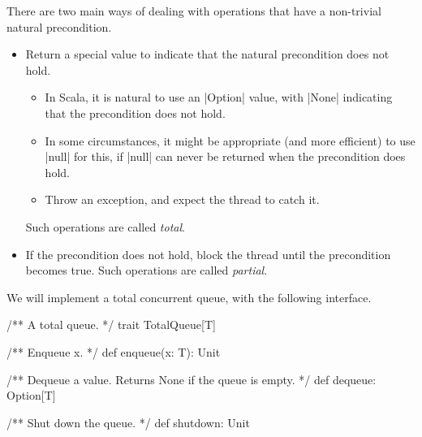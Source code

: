 






\begin{slide}

There are two main ways of dealing with operations that have a non-trivial
natural precondition.
%
\begin{itemize}
\item Return a special value to indicate that the natural precondition does
not hold.
\begin{itemize}
\item In Scala, it is natural to use an |Option| value, with |None| indicating
that the precondition does not hold.  
\item In some circumstances, it might be appropriate (and more efficient) to
use |null| for this, if |null| can never be returned when the precondition
does hold.
\item Throw an exception, and expect the thread to catch it.
\end{itemize}
%
Such operations are called \emph{total}. 

\item
If the precondition does not hold, block the thread until the precondition
becomes true.  Such operations are called \emph{partial}.
\end{itemize}
\end{slide}



\begin{slide}

We will implement a total concurrent queue, with the following interface.
%
\begin{scala}
/** A total queue. */
trait TotalQueue[T]{
  /** Enqueue x. */
  def enqueue(x: T): Unit

  /** Dequeue a value.  Returns None if the queue is empty. */
  def dequeue: Option[T]

  /** Shut down the queue. */
  def shutdown: Unit
}
\end{scala}
\end{slide}

